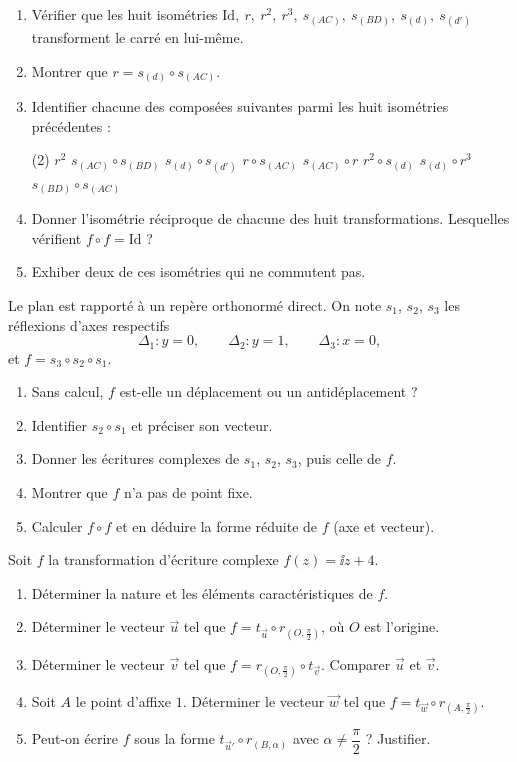 \begin{enumerate}
	\item Vérifier que les huit isométries
	$\mathrm{Id},\ r,\ r^2,\ r^3,\ s_{(AC)},\ s_{(BD)},\ s_{(d)},\ s_{(d')}$
	transforment le carré en lui-même.
	\item Montrer que $r=s_{(d)}\circ s_{(AC)}$.
	\item Identifier chacune des composées suivantes parmi les huit
	isométries précédentes :
	\begin{listecol}(2)
		\task $r^2$
		\task $s_{(AC)}\circ s_{(BD)}$
		\task $s_{(d)}\circ s_{(d')}$
		\task $r\circ s_{(AC)}$
		\task $s_{(AC)}\circ r$
		\task $r^2\circ s_{(d)}$
		\task $s_{(d)}\circ r^3$
		\task $s_{(BD)}\circ s_{(AC)}$
	\end{listecol}
	\item Donner l'isométrie réciproque de chacune des huit transformations.
	Lesquelles vérifient $f\circ f=\mathrm{Id}$ ?
	\item Exhiber deux de ces isométries qui ne commutent pas.
\end{enumerate}

Le plan est rapporté à un repère orthonormé direct. On note $s_1$, $s_2$,
$s_3$ les réflexions d'axes respectifs
$$
\Delta_1 : y=0,\qquad \Delta_2 : y=1,\qquad \Delta_3 : x=0,
$$
et $f=s_3\circ s_2\circ s_1$.
\begin{enumerate}
	\item Sans calcul, $f$ est-elle un déplacement ou un antidéplacement ?
	\item Identifier $s_2\circ s_1$ et préciser son vecteur.
	\item Donner les écritures complexes de $s_1$, $s_2$, $s_3$, puis celle
	de $f$.
	\item Montrer que $f$ n'a pas de point fixe.
	\item Calculer $f\circ f$ et en déduire la forme réduite de $f$ (axe et
	vecteur).
\end{enumerate}

Soit $f$ la transformation d'écriture complexe $f(z)=\ii z+4$.
\begin{enumerate}
	\item Déterminer la nature et les éléments caractéristiques de $f$.
	\item Déterminer le vecteur $\vec u$ tel que
	$f=t_{\vec u}\circ r_{(O,\frac{\pi}{2})}$, où $O$ est l'origine.
	\item Déterminer le vecteur $\vec v$ tel que
	$f=r_{(O,\frac{\pi}{2})}\circ t_{\vec v}$. Comparer $\vec u$ et $\vec v$.
	\item Soit $A$ le point d'affixe $1$. Déterminer le vecteur $\vec w$ tel
	que $f=t_{\vec w}\circ r_{(A,\frac{\pi}{2})}$.
	\item Peut-on écrire $f$ sous la forme $t_{\vec u'}\circ r_{(B,\alpha)}$
	avec $\alpha\neq\dfrac{\pi}{2}$ ? Justifier.
\end{enumerate}

